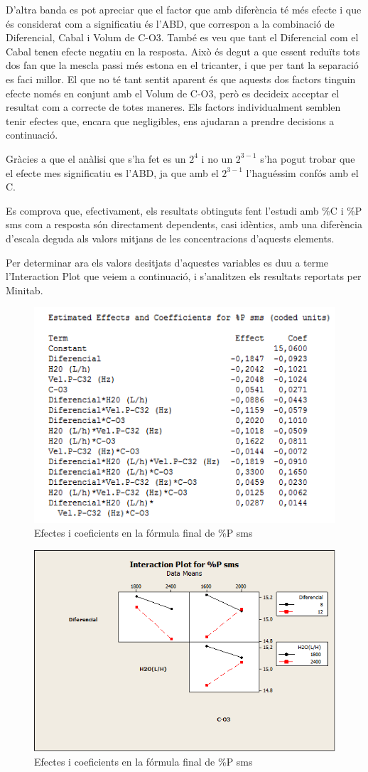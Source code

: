 \documentclass[a4paper]{article}
\begin{document}
D’altra banda es pot apreciar que el factor que amb diferència té més efecte i que és considerat com a significatiu és l’ABD, que correspon a la combinació de Diferencial, Cabal i Volum de C-O3. També es veu que tant el Diferencial com el Cabal tenen efecte negatiu en la resposta. Això és degut a que essent reduïts tots dos fan que la mescla passi més estona en el tricanter, i que per tant la separació es faci millor. El que no té tant sentit aparent és que aquests dos factors tinguin efecte només en conjunt amb el Volum de C-O3, però es decideix acceptar el resultat com a correcte de totes maneres. Els factors individualment semblen tenir efectes que, encara que negligibles, ens ajudaran a prendre decisions a continuació.

Gràcies a que el anàlisi que s'ha fet es un $2^4$ i no un $2^{3-1}$ s'ha pogut trobar que el efecte mes significatiu es l'ABD, ja que amb el $2^{3-1}$ l'haguéssim confós amb el C. 

Es comprova que, efectivament, els resultats obtinguts fent l’estudi amb \%C i \%P sms com a resposta són directament dependents, casi idèntics, amb una diferència d’escala deguda als valors mitjans de les concentracions d’aquests elements.
 
Per determinar ara els valors desitjats d’aquestes variables es duu a terme l’Interaction Plot que veiem a continuació, i s’analitzen els resultats reportats per Minitab.

\begin{figure}[H]
	\centering
	\includegraphics[width=.5\textwidth]{images/Coefs}
	\caption{Efectes i coeficients en la fórmula final de \%P sms}
	\label{fig:Coefs}
\end{figure} 	

\begin{figure}[H]
	\centering
	\includegraphics[width=.5\textwidth]{images/InteractionP}
	\caption{Efectes i coeficients en la fórmula final de \%P sms}
	\label{fig:InteractionP}
\end{figure} 
\end{document}
